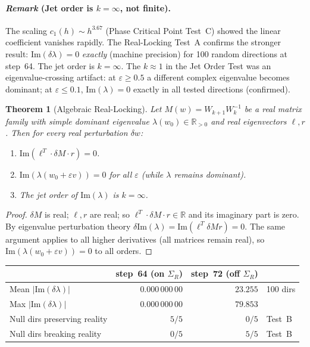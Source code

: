 \documentclass[11pt]{amsart}
\newtheorem{theorem}{Theorem}[section]
\begin{document}
\paragraph{\textit{Remark} (Jet order is $k=\infty$, not finite).}
The scaling $c_1(h) \sim h^{3.67}$ (Phase Critical Point Test~C)
showed the linear coefficient vanishes rapidly.
The Real-Locking Test~A confirms the stronger result:
$\mathrm{Im}(\delta\lambda) = 0$ \emph{exactly} (machine precision)
for 100 random directions at step~64.
The jet order is $k = \infty$.
The $k \approx 1$ in the Jet Order Test was an eigenvalue-crossing
artifact: at $\varepsilon \geq 0.5$ a different complex eigenvalue
becomes dominant; at $\varepsilon \leq 0.1$, $\mathrm{Im}(\lambda) = 0$
exactly in all tested directions (confirmed).

\begin{theorem}[Algebraic Real-Locking]
\label{thm:real_locking}
Let $M(w) = W_{k+1}W_k^{-1}$ be a real matrix family with simple
dominant eigenvalue $\lambda(w_0) \in \mathbb{R}_{>0}$ and real
eigenvectors $\ell, r$.
Then for every real perturbation $\delta w$:
\begin{enumerate}
\item $\mathrm{Im}(\ell^T \cdot \delta M \cdot r) = 0$.
\item $\mathrm{Im}(\lambda(w_0 + \varepsilon v)) = 0$ for all
  $\varepsilon$ (while $\lambda$ remains dominant).
\item The jet order of $\mathrm{Im}(\lambda)$ is $k = \infty$.
\end{enumerate}
\end{theorem}

\begin{proof}
$\delta M$ is real; $\ell, r$ are real; so $\ell^T\!\cdot\!\delta M\!\cdot\! r \in \mathbb{R}$
and its imaginary part is zero.
By eigenvalue perturbation theory $\delta\mathrm{Im}(\lambda) = \mathrm{Im}(\ell^T\delta M r) = 0$.
The same argument applies to all higher derivatives (all matrices remain real),
so $\mathrm{Im}(\lambda(w_0+\varepsilon v)) = 0$ to all orders.
\end{proof}

\begin{center}\small
\begin{tabular}{@{}lrrl@{}}
\toprule
 & step~64 (on $\Sigma_R$) & step~72 (off $\Sigma_R$) & \\
\midrule
Mean $|\mathrm{Im}(\delta\lambda)|$ & $0.000\,000\,00$ & $23.255$ & 100 dirs \\
Max  $|\mathrm{Im}(\delta\lambda)|$ & $0.000\,000\,00$ & $79.853$ & \\
Null dirs preserving reality & $5/5$ & $0/5$ & Test~B \\
Null dirs breaking reality   & $0/5$ & $5/5$ & Test~B \\
\bottomrule
\end{tabular}
\end{center}
\end{document}
